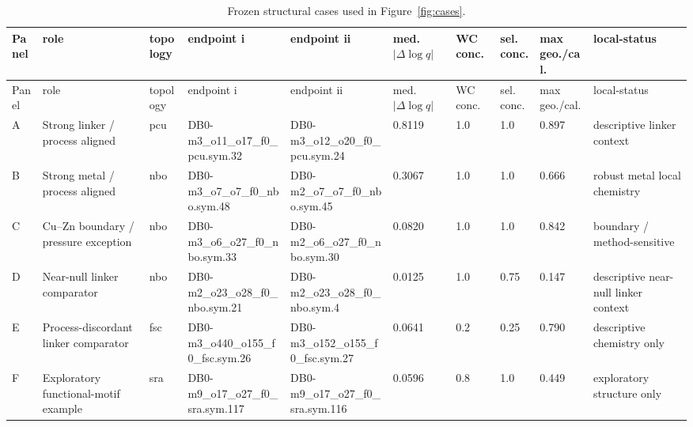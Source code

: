 \begin{landscape}
\begin{longtable}{llllllllll}
\caption{Frozen structural cases used in Figure~\ref{fig:cases}.}\label{tab:si_structural_cases}\\
\toprule
Panel & role & topology & endpoint i & endpoint ii & med. $|\Delta\log q|$ & WC conc. & sel. conc. & max geo./cal. & local-status \\
\midrule
\endfirsthead
\toprule
Panel & role & topology & endpoint i & endpoint ii & med. $|\Delta\log q|$ & WC conc. & sel. conc. & max geo./cal. & local-status \\
\midrule
\endhead
A & Strong linker / process aligned & pcu & DB0-m3\_o11\_o17\_f0\_pcu.sym.32 & DB0-m3\_o12\_o20\_f0\_pcu.sym.24 & 0.8119 & 1.0 & 1.0 & 0.897 & descriptive linker context \\
B & Strong metal / process aligned & nbo & DB0-m3\_o7\_o7\_f0\_nbo.sym.48 & DB0-m2\_o7\_o7\_f0\_nbo.sym.45 & 0.3067 & 1.0 & 1.0 & 0.666 & robust metal local chemistry \\
C & Cu--Zn boundary / pressure exception & nbo & DB0-m3\_o6\_o27\_f0\_nbo.sym.33 & DB0-m2\_o6\_o27\_f0\_nbo.sym.30 & 0.0820 & 1.0 & 1.0 & 0.842 & boundary / method-sensitive \\
D & Near-null linker comparator & nbo & DB0-m2\_o23\_o28\_f0\_nbo.sym.21 & DB0-m2\_o23\_o28\_f0\_nbo.sym.4 & 0.0125 & 1.0 & 0.75 & 0.147 & descriptive near-null linker context \\
E & Process-discordant linker comparator & fsc & DB0-m3\_o440\_o155\_f0\_fsc.sym.26 & DB0-m3\_o152\_o155\_f0\_fsc.sym.27 & 0.0641 & 0.2 & 0.25 & 0.790 & descriptive chemistry only \\
F & Exploratory functional-motif example & sra & DB0-m9\_o17\_o27\_f0\_sra.sym.117 & DB0-m9\_o17\_o27\_f0\_sra.sym.116 & 0.0596 & 0.8 & 1.0 & 0.449 & exploratory structure only \\
\bottomrule
\end{longtable}
\end{landscape}
